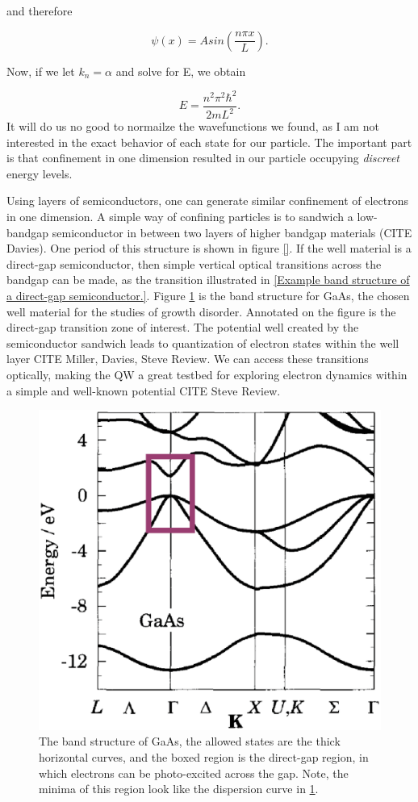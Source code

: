 and therefore

\begin{equation}
\psi(x) = A sin(\frac{n \pi x}{L}).
\end{equation}

Now, if we let $k_n = \alpha$ and solve for E, we obtain

\begin{equation}
E = \frac{n^2 \pi^2 \hbar^2}{2 m L^2}.
\end{equation}
It will do us no good to normailze the wavefunctions we found, as I am not interested in the exact behavior of each state for our particle. The important part is that confinement in one dimension resulted in our particle occupying \textit{discreet} energy levels. 

\indent Using layers of semiconductors, one can generate similar confinement of electrons in one dimension. A simple way of confining particles is to sandwich a low-bandgap semiconductor in between two layers of higher bandgap materials (CITE Davies). One period of this structure is shown in figure \ref{}. If the well material is a direct-gap semiconductor, then simple vertical optical transitions across the bandgap can be made, as the transition illustrated in \ref{Example band structure of a direct-gap semiconductor.}. Figure \ref{GaAsBstruct} is the band structure for GaAs, the chosen well material for the studies of growth disorder. Annotated on the figure is the direct-gap transition zone of interest. The potential well created by the semiconductor sandwich leads to quantization of electron states within the well layer CITE Miller, Davies, Steve Review. We can access these transitions optically, making the QW a great testbed for exploring electron dynamics within a simple and well-known potential CITE Steve Review. 

\begin{figure}[h!]
\centering
\includegraphics[width = .5\textwidth]{GaAsBstruct.eps}
\caption{The band structure of GaAs, the allowed states are the thick horizontal curves, and the boxed region is the direct-gap region, in which electrons can be photo-excited across the gap. Note, the minima of this region look like the dispersion curve in \ref{GaAsBstruct}.}
\label{GaAsBstruct}
\end{figure}


